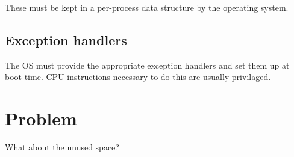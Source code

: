 These must be kept in a per-process data structure by the operating system.

\subsection{Exception handlers}

The OS must provide the appropriate exception handlers and set them up at boot time.
CPU instructions necessary to do this are usually privilaged.

\section{Problem}

What about the unused space?



